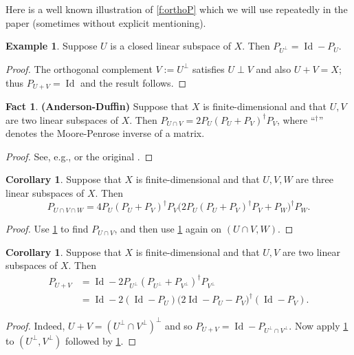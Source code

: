 \documentclass[11pt]{article}
\newcommand{\Id}{\ensuremath{\operatorname{Id}}}
\theoremstyle{definition}
\newtheorem{corollary}[theorem]{Corollary}
\newtheorem{example}[theorem]{Example}
\newtheorem{fact}[theorem]{Fact}
\providecommand{\Id}{\operatorname{{ Id}}}
\providecommand{\Id}{\operatorname{Id}}
\begin{document}
{Here is a well known illustration of \cref{f:orthoP} which
we will use repeatedly in the paper (sometimes without explicit mentioning). 

\begin{example}
\label{ex:perp}
Suppose $U$ is a closed linear subspace of $X$.
Then
$P_{U^\perp} = \Id-P_U$. 
\end{example}
\begin{proof}
The orthogonal complement $V := U^\perp$ satisfies $U\perp V$
and also $U+V=X$; thus $P_{U+V}=\Id$ and the result follows.
\end{proof}

\begin{fact} {\bf (Anderson-Duffin)} 
\label{f:AD}
Suppose that $X$ is finite-dimensional and that 
$U,V$ are two linear subspaces of $X$.
Then
$P_{U\cap V} = 2P_U(P_U+P_V)^\dagger P_V$,
where ``$^\dagger$'' denotes the Moore-Penrose inverse of a matrix.
\end{fact}
\begin{proof}
See, e.g., \cite[Corollary~25.38]{BC2017} or
the original \cite{AD}. 
\end{proof}

\begin{corollary}
\label{c:AD3}
Suppose that $X$ is finite-dimensional and that 
$U,V,W$ are three linear subspaces of $X$.
Then
\begin{equation*}
P_{U\cap V\cap W} = 4P_U(P_U+P_V)^\dagger P_V\big(2P_U(P_U+P_V)^\dagger P_V+P_W\big)^\dagger P_W. 
\end{equation*}
\end{corollary}
\begin{proof}
Use \cref{f:AD} to find $P_{U\cap V}$,
and then use \cref{f:AD} again on $(U\cap V,W)$. 
\end{proof}

\begin{corollary}
\label{c:ADsum}
Suppose that $X$ is finite-dimensional and that $U,V$ are two linear
subspaces of $X$. 
Then
\begin{align*}
P_{U+V} &= \Id-2P_{U^\perp}(P_{U^\perp}+P_{V^\perp})^\dagger P_{V^\perp}\\
&=\Id-2(\Id-P_U)\big(2\Id-P_U-P_V \big)^\dagger(\Id-P_V).
\end{align*}
\end{corollary}
\begin{proof}
Indeed, $U+V = (U^\perp\cap V^\perp)^\perp$ and so 
$P_{U+V} = \Id - P_{U^\perp\cap V^\perp}$.
Now apply \cref{f:AD} to $(U^\perp,V^\perp)$
followed by \cref{ex:perp}. 
\end{proof}

}
\end{document}
